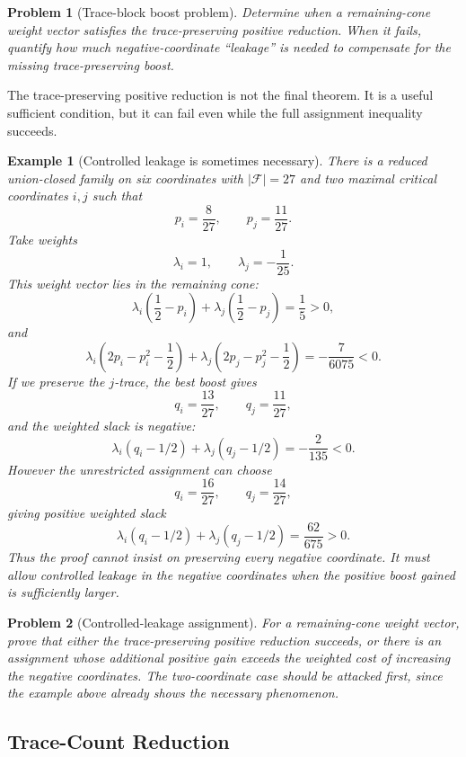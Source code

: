 \documentclass[11pt]{article}
\newtheorem{problem}{Problem}
\newtheorem{example}{Example}
\begin{document}
\begin{problem}[Trace-block boost problem]
Determine when a remaining-cone weight vector satisfies the trace-preserving
positive reduction.  When it fails, quantify how much negative-coordinate
``leakage'' is needed to compensate for the missing trace-preserving boost.
\end{problem}

The trace-preserving positive reduction is not the final theorem.  It is a
useful sufficient condition, but it can fail even while the full assignment
inequality succeeds.

\begin{example}[Controlled leakage is sometimes necessary]
There is a reduced union-closed family on six coordinates with
$|\mathcal{F}|=27$ and two maximal critical coordinates $i,j$ such that
\[
  p_i=\frac8{27},
  \qquad
  p_j=\frac{11}{27}.
\]
Take weights
\[
  \lambda_i=1,
  \qquad
  \lambda_j=-\frac1{25}.
\]
This weight vector lies in the remaining cone:
\[
  \lambda_i\left(\frac12-p_i\right)
  +
  \lambda_j\left(\frac12-p_j\right)
  =
  \frac15>0,
\]
and
\[
  \lambda_i\left(2p_i-p_i^2-\frac12\right)
  +
  \lambda_j\left(2p_j-p_j^2-\frac12\right)
  =
  -\frac{7}{6075}<0.
\]
If we preserve the $j$-trace, the best boost gives
\[
  q_i=\frac{13}{27},
  \qquad
  q_j=\frac{11}{27},
\]
and the weighted slack is negative:
\[
  \lambda_i(q_i-1/2)+\lambda_j(q_j-1/2)
  =
  -\frac{2}{135}<0.
\]
However the unrestricted assignment can choose
\[
  q_i=\frac{16}{27},
  \qquad
  q_j=\frac{14}{27},
\]
giving positive weighted slack
\[
  \lambda_i(q_i-1/2)+\lambda_j(q_j-1/2)
  =
  \frac{62}{675}>0.
\]
Thus the proof cannot insist on preserving every negative coordinate.  It
must allow controlled leakage in the negative coordinates when the positive
boost gained is sufficiently larger.
\end{example}

\begin{problem}[Controlled-leakage assignment]
For a remaining-cone weight vector, prove that either the trace-preserving
positive reduction succeeds, or there is an assignment whose additional
positive gain exceeds the weighted cost of increasing the negative
coordinates.  The two-coordinate case should be attacked first, since the
example above already shows the necessary phenomenon.
\end{problem}

\subsection{Trace-Count Reduction}
\end{document}
